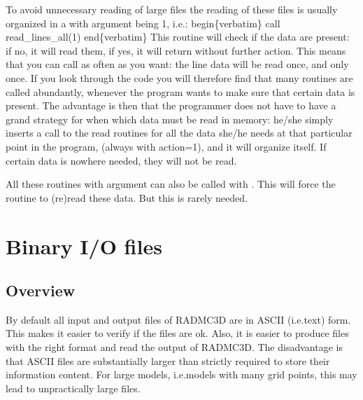 \documentclass[letterpaper,10pt,english]{sphinxmanual}
\begin{document}
To avoid unnecessary reading of large files the reading of these files is
usually organized in a  with argument  being 1,
i.e.:
begin\{verbatim\}
call read\_lines\_all(1)
end\{verbatim\}
This routine will check if the data are present: if no, it will read them,
if yes, it will return without further action. This means that you can call
 as often as you want: the line data will be read
once, and only once. If you look through the code you will therefore find
that many  routines are called abundantly, whenever the
program wants to make sure that certain data is present. The advantage is
then that the programmer does not have to have a grand strategy for when
which data must be read in memory: he/she simply inserts a call to the read
routines for all the data she/he needs at that particular point in the
program, (always with action=1), and it will organize itself. If certain
data is nowhere needed, they will not be read.

All these  routines with argument  can also
be called with . This will force the routine to (re\sphinxhyphen{})read
these data. But this is rarely needed.


\chapter{Binary I/O files}
\label{\detokenize{binaryio:binary-i-o-files}}\label{\detokenize{binaryio:chap-binary-io}}\label{\detokenize{binaryio::doc}}

\section{Overview}
\label{\detokenize{binaryio:overview}}\label{\detokenize{binaryio:sec-unformatted-overview}}
By default all input and output files of RADMC\sphinxhyphen{}3D are in ASCII (i.e.text)
form. This makes it easier to verify if the files are ok. Also, it is easier
to produce files with the right format and read the output of RADMC\sphinxhyphen{}3D. The
disadvantage is that ASCII files are substantially larger than strictly
required to store their information content. For large models, i.e.models
with many grid points, this may lead to unpractically large files.
\end{document}
